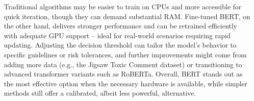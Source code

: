 \noindent Traditional algorithms may be easier to train on CPUs and more accessible for quick iteration, though they can demand substantial RAM. Fine-tuned BERT, on the other hand, delivers stronger performance and can be retrained efficiently with adequate GPU support -- ideal for real-world scenarios requiring rapid updating. Adjusting the decision threshold can tailor the model’s behavior to specific guidelines or risk tolerances, and further improvements might come from adding more data (e.g., the Jigsaw Toxic Comment dataset) or transitioning to advanced transformer variants such as RoBERTa. Overall, BERT stands out as the most effective option when the necessary hardware is available, while simpler methods still offer a calibrated, albeit less powerful, alternative. \cite{Liu2019}